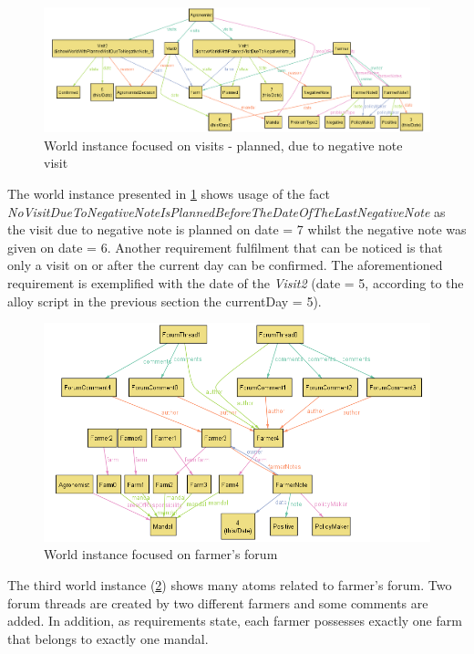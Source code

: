 \begin{figure}[H]
    \centering
    \includegraphics[width=\textwidth, keepaspectratio, origin=c]{alloy/world_instances/showWorldWithPlannedVisitDueToNegativeNote2.png}
    \caption{World instance focused on visits - planned, due to negative note visit}
    \label{fig:planned_negative_note}
\end{figure}
The world instance presented in \ref{fig:planned_negative_note} shows usage of the fact \textit{NoVisitDueToNegativeNoteIsPlannedBeforeTheDateOfTheLastNegativeNote} as the visit due to negative note is planned on date = 7 whilst the negative note was given on date = 6. Another requirement fulfilment that can be noticed is that  only a visit on or after the current day can be confirmed. The aforementioned requirement is exemplified with the date of the \textit{Visit2} (date = 5, according to the alloy script in the previous section the currentDay = 5).

\begin{figure}[H]
    \centering
    \includegraphics[width=\textwidth, keepaspectratio, origin=c]{alloy/world_instances/showWorldFocusedOnForum2.png}
    \caption{World instance focused on farmer's forum}
    \label{fig:forum}
\end{figure}
The third world instance (\ref{fig:forum}) shows many atoms related to farmer's forum. Two forum threads are created by two different farmers and some comments are added. In addition, as requirements state, each farmer possesses exactly one farm that belongs to exactly one mandal. 


